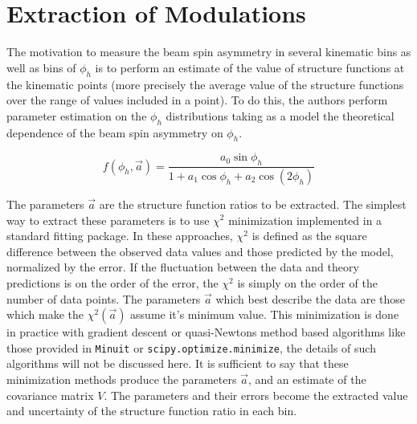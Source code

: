 \section{Extraction of Modulations}
The motivation to measure the beam spin asymmetry in several kinematic bins as well as bins of $\phi_{h}$ is to perform an estimate of the value of structure functions at the kinematic points (more precisely the average value of the structure functions over the range of values included in a point).  To do this, the authors perform parameter estimation on the $\phi_{h}$ distributions taking as a model the theoretical dependence of the beam spin asymmetry on $\phi_{h}$.

\begin{equation}
  f(\phi_h, \vec{a}) = \frac{a_0 \sin\phi_h}{1 + a_1 \cos\phi_h + a_2 \cos(2\phi_h)}
\end{equation}

The parameters $\vec{a}$ are the structure function ratios to be extracted.  The simplest way to extract these parameters is to use $\chi^2$ minimization implemented in a standard fitting package.  In these approaches, $\chi^2$ is defined as the square difference between the observed data values and those predicted by the model, normalized by the error.  If the fluctuation between the data and theory predictions is on the order of the error, the $\chi^2$ is simply on the order of the number of data points.  The parameters $\vec{a}$ which best describe the data are those which make the $\chi^2 (\vec{a})$ assume it's minimum value.  This minimization is done in practice with gradient descent or quasi-Newtons method based algorithms like those provided in \texttt{Minuit} or \texttt{scipy.optimize.minimize}, the details of such algorithms will not be discussed here.  It is sufficient to say that these minimization methods produce the parameters $\vec{a}$, and an estimate of the covariance matrix $V$.  The parameters and their errors become the extracted value and uncertainty of the structure function ratio in each bin. \\


